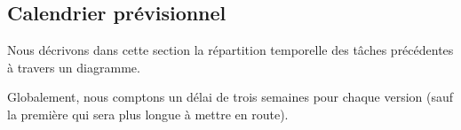 \documentclass{article}
\begin{document}
\subsection{\label{calendrier}Calendrier prévisionnel}

Nous décrivons dans cette section la répartition temporelle des tâches précédentes à travers un diagramme.

Globalement, nous comptons un délai de trois semaines pour chaque version (sauf la première qui sera plus longue à mettre en route).


\newpage

\end{document}
